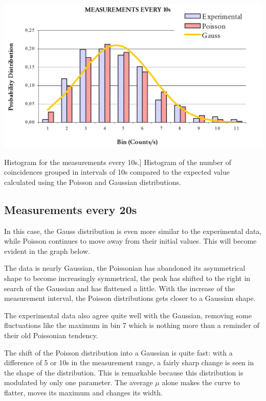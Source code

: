 	\bfi[H]
		\bc
			\includegraphics[width=.9\textwidth]{img/pdist2.png}
			\caption
				[Histogram for the measurements every 10s.]
				{Histogram of the number of coincidences grouped in intervals of 10s compared to the expected value calculated using the Poisson and Gaussian distributions.}\label{fig:10s}
		\ec
	\efi

\subsection{Measurements every 20s}

In this case, the Gauss distribution is even more similar to the experimental data, while Poisson continues to move away from their initial values. This will become evident in the graph below.

The data is nearly Gaussian, the Poissonian has abandoned its asymmetrical shape to become increasingly symmetrical, the peak has shifted to the right in search of the Gaussian and has flattened a little. With the increase of the measurement interval, the Poisson distributions gets closer to a Gaussian shape.

The experimental data also agree quite well with the Gaussian, removing some fluctuations like the maximum in bin 7 which is nothing more than a reminder of their old Poissonian tendency.

The shift of the Poisson distribution into a Gaussian is quite fast: with a difference of 5 or 10s in the measurement range, a fairly sharp change is seen in the shape of the distribution. This is remarkable because this distribution is modulated by only one parameter. The average $\mu$ alone makes the curve to flatter, moves its maximum and changes its width.

